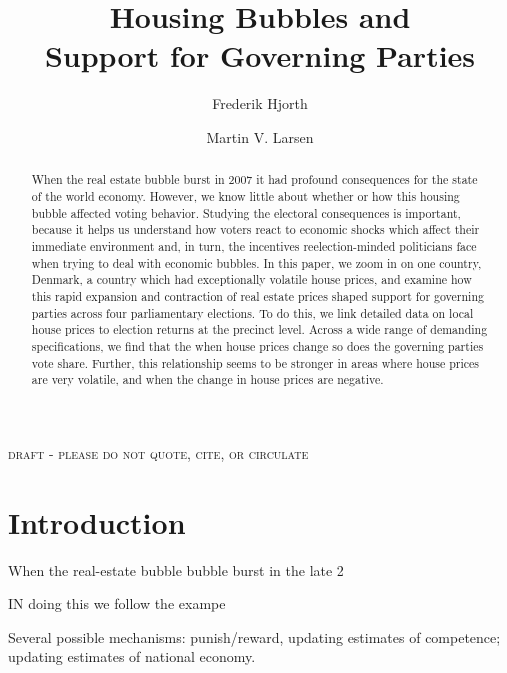 \documentclass[12pt,a4paper]{article}
\title{\textbf{Housing Bubbles and \\Support for Governing Parties}}
\author{
Frederik Hjorth \and Martin V. Larsen}
\begin{document}
\maketitle

\begin{center}
\textsc{draft - please do not quote, cite, or circulate}
\end{center}

\begin{abstract}
\noindent When the real estate bubble burst in 2007 it had profound consequences for the state of the world economy. However, we know little about whether or how this housing bubble affected voting behavior. Studying the electoral consequences is important, because it helps us understand how voters react to economic shocks which affect their immediate environment and, in turn, the incentives reelection-minded politicians face when trying to deal with economic bubbles. In this paper, we zoom in on one country, Denmark, a country which had exceptionally volatile house prices, and examine how this rapid expansion and contraction of real estate prices shaped support for governing parties across four parliamentary elections. To do this, we link detailed data on local house prices to election returns at the precinct level. Across a wide range of demanding specifications, we find that the when house prices change so does the governing parties vote share. Further, this relationship seems to be stronger in areas where house prices are very volatile, and when the change in house prices are negative.
 
\end{abstract}



\newpage

\onehalfspacing

\section{Introduction}

When the real-estate bubble bubble burst in the late 2

IN doing this we follow the exampe

Several possible mechanisms: punish/reward, updating estimates of competence; updating estimates of national economy.
\end{document}
